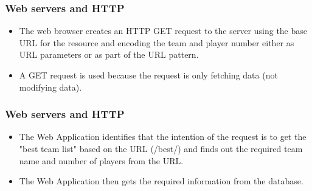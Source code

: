 \documentclass{beamer}
\begin{document}
\begin{frame}
\frametitle{Web servers and HTTP }
\begin{itemize}
 \item The web browser creates an HTTP GET request to the server using the base URL for the resource and encoding the team and player number either as URL parameters or as part of the URL pattern. 
 \item A GET request is used because the request is only fetching data (not modifying data).
   \end{itemize}
\end{frame}
\begin{frame}
\frametitle{Web servers and HTTP }
\begin{itemize}
 \item The Web Application identifies that the intention of the request is to get the "best team list" based on the URL (/best/) and finds out the required team name and number of players from the URL. 
 \item The Web Application then gets the required information from the database.
   \end{itemize}
\end{frame}
\end{document}
